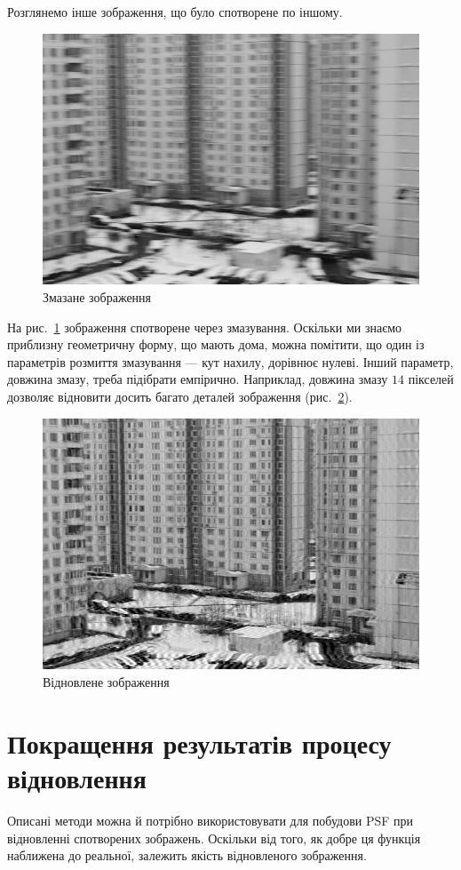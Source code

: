 \documentclass{diploma}
\begin{document}
    Розглянемо інше зображення, що було спотворене по іншому.

    \begin{figure}[hb]
      \centering
      \includegraphics[width=0.80\linewidth]{house-mot.png}
      \caption{Змазане зображення}
      \label{fig:house:blurred}
    \end{figure}

    На рис.~\ref{fig:house:blurred} зображення спотворене через змазування.
    Оскільки ми знаємо приблизну геометричну форму, що мають дома, можна
    помітити, що один із параметрів розмиття змазування --- кут нахилу,
    дорівнює нулеві.
    Інший параметр, довжина змазу, треба підібрати емпірично.
    Наприклад, довжина змазу $14$ пікселей дозволяє відновити досить багато
    деталей зображення (рис.~\ref{fig:house:unblurred}).

    \begin{figure}[ht]
      \centering
      \includegraphics[width=0.8\linewidth]{house-unmot.png}
      \caption{Відновлене зображення}
      \label{fig:house:unblurred}
    \end{figure}
    \clearpage
  \section{Покращення результатів процесу відновлення}
    Описані методи можна й потрібно використовувати для побудови PSF при
    відновленні спотворених зображень.
    Оскільки від того, як добре ця функція наближена до реальної, залежить
    якість відновленого зображення.
\end{document}
